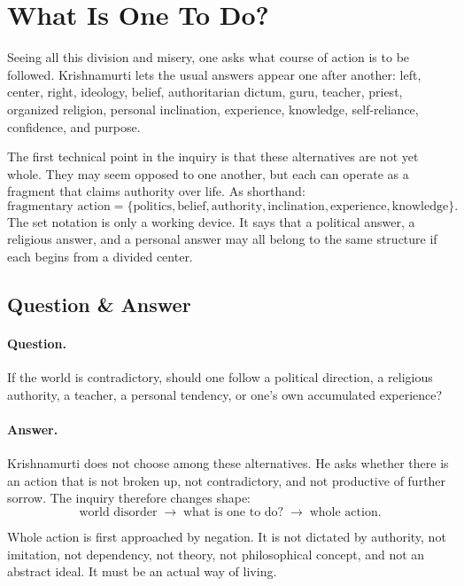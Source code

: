 \section{What Is One To Do?}

Seeing all this division and misery, one asks what course of action is to be followed. Krishnamurti lets the usual answers appear one after another: left, center, right, ideology, belief, authoritarian dictum, guru, teacher, priest, organized religion, personal inclination, experience, knowledge, self-reliance, confidence, and purpose.

The first technical point in the inquiry is that these alternatives are not yet whole. They may seem opposed to one another, but each can operate as a fragment that claims authority over life. As shorthand:
\begin{equation}
\text{fragmentary action}
=
\{\text{politics},\text{belief},\text{authority},
\text{inclination},\text{experience},\text{knowledge}\}.
\end{equation}
The set notation is only a working device. It says that a political answer, a religious answer, and a personal answer may all belong to the same structure if each begins from a divided center.

\subsection{Question \& Answer}

\paragraph{Question.}
If the world is contradictory, should one follow a political direction, a religious authority, a teacher, a personal tendency, or one's own accumulated experience?

\paragraph{Answer.}
Krishnamurti does not choose among these alternatives. He asks whether there is an action that is not broken up, not contradictory, and not productive of further sorrow. The inquiry therefore changes shape:
\begin{equation}
\text{world disorder}
\;\longrightarrow\;
\text{what is one to do?}
\;\longrightarrow\;
\text{whole action}.
\end{equation}

Whole action is first approached by negation. It is not dictated by authority, not imitation, not dependency, not theory, not philosophical concept, and not an abstract ideal. It must be an actual way of living.

